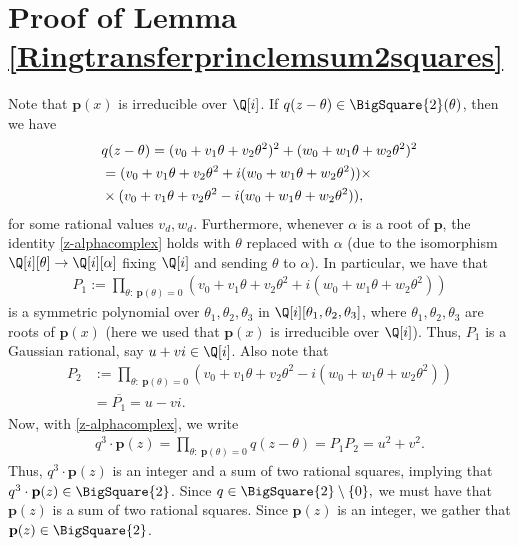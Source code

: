 \documentclass[12pt]{amsart}
\newcommand{\1}{\mathmybb{1}}
\begin{document}
\section{Proof of Lemma \ref{Ringtransferprinclemsum2squares}}
Note that $\mathbf{p}(x)$ is irreducible over $\Q[i]$. If $q(z-\theta) \in \BigSquare{2}(\theta)$, then we have
\begin{align}
\label{z-alphacomplex}
&q(z-\theta) = (v_{0}+v_{1}\theta+v_{2}\theta^2)^2 + (w_{0}+w_{1}\theta+w_{2}\theta^2)^2 \notag\\
&=(v_{0}+v_{1}\theta+v_{2}\theta^2 +i(w_{0}+w_{1}\theta+w_{2}\theta^2))\times\\ &\times(v_{0}+v_{1}\theta+v_{2}\theta^2 -i(w_{0}+w_{1}\theta+w_{2}\theta^2))\notag,
\end{align}
for some rational values $v_{d},w_{d}$. Furthermore, whenever $\alpha$ is a root of $\mathbf{p}$, the identity \eqref{z-alphacomplex} holds with $\theta$ replaced with $\alpha$ (due to the isomorphism $\Q[i][\theta] \rightarrow \Q[i][\alpha]$ fixing $\Q[i]$ and sending $\theta$ to $\alpha$). In particular, we have that
\begin{align*}
P_{1} := \prod_{\theta: \ \mathbf{p}(\theta) = 0}(v_{0}+v_{1}\theta+v_{2}\theta^2 +i(w_{0}+w_{1}\theta+w_{2}\theta^2))
\end{align*}
is a symmetric polynomial over $\theta_{1},\theta_{2},\theta_{3}$ in $\Q[i][\theta_{1},\theta_{2},\theta_{3}]$, where $\theta_{1},\theta_{2},\theta_{3}$ are roots of $\mathbf{p}(x)$ (here we used that $\mathbf{p}(x)$ is irreducible over $\Q[i]$). Thus, $P_{1}$ is a Gaussian rational, say $u+vi \in \Q[i]$. Also note that
\begin{align*}
P_{2} &:= \prod_{\theta: \ \mathbf{p}(\theta) = 0}(v_{0}+v_{1}\theta+v_{2}\theta^2 -i(w_{0}+w_{1}\theta+w_{2}\theta^2))\\
&= \overline{P_{1}} = u-vi.
\end{align*}
Now, with \eqref{z-alphacomplex}, we write
\begin{align*}
q^3\cdot\mathbf{p}(z) = \prod_{\theta: \ \mathbf{p}(\theta) = 0}q(z-\theta) = P_{1}P_{2} = u^2+v^2.
\end{align*}
Thus, $q^3\cdot\mathbf{p}(z)$ is an integer and a sum of two rational squares, implying that $q^3\cdot\mathbf{p}(z) \in \BigSquare{2}$. Since $q \in \BigSquare{2}\setminus\{0\},$ we must have that $\mathbf{p}(z)$ is a sum of two rational squares. Since $\mathbf{p}(z)$ is an integer, we gather that $\mathbf{p}(z) \in \BigSquare{2}$. 
\end{document}
